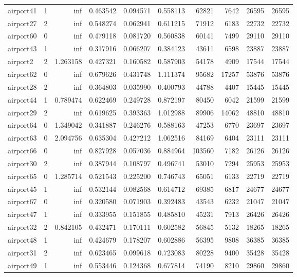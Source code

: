\begin{longtable}{|l|r|r|r|r|r|r|r|r|r|}
airport41 & 1 & inf & 0.463542 & 0.094571 & 0.558113 & 62821 & 7642 & 26595 & 26595 \\
airport27 & 2 & inf & 0.548274 & 0.062941 & 0.611215 & 71912 & 6183 & 22732 & 22732 \\
airport60 & 0 & inf & 0.479118 & 0.081720 & 0.560838 & 60141 & 7499 & 29110 & 29110 \\
airport43 & 1 & inf & 0.317916 & 0.066207 & 0.384123 & 43611 & 6598 & 23887 & 23887 \\
airport2 & 2 & 1.263158 & 0.427321 & 0.160582 & 0.587903 & 54178 & 4909 & 17544 & 17544 \\
airport62 & 0 & inf & 0.679626 & 0.431748 & 1.111374 & 95682 & 17257 & 53876 & 53876 \\
airport28 & 2 & inf & 0.364803 & 0.035990 & 0.400793 & 44788 & 4407 & 15445 & 15445 \\
airport44 & 1 & 0.789474 & 0.622469 & 0.249728 & 0.872197 & 80450 & 6042 & 21599 & 21599 \\
airport29 & 2 & inf & 0.619625 & 0.393363 & 1.012988 & 89906 & 14062 & 48810 & 48810 \\
airport64 & 0 & 1.349042 & 0.341887 & 0.246276 & 0.588163 & 47253 & 6770 & 23697 & 23697 \\
airport63 & 0 & 2.094756 & 0.635304 & 0.427212 & 1.062516 & 84169 & 6404 & 23111 & 23111 \\
airport66 & 0 & inf & 0.827928 & 0.057036 & 0.884964 & 103560 & 7182 & 26126 & 26126 \\
airport30 & 2 & inf & 0.387944 & 0.108797 & 0.496741 & 53010 & 7294 & 25953 & 25953 \\
airport65 & 0 & 1.285714 & 0.521543 & 0.225200 & 0.746743 & 65051 & 6133 & 22719 & 22719 \\
airport45 & 1 & inf & 0.532144 & 0.082568 & 0.614712 & 69385 & 6817 & 24677 & 24677 \\
airport67 & 0 & inf & 0.320580 & 0.071903 & 0.392483 & 43543 & 6232 & 21047 & 21047 \\
airport47 & 1 & inf & 0.333955 & 0.151855 & 0.485810 & 45231 & 7913 & 26426 & 26426 \\
airport32 & 2 & 0.842105 & 0.432471 & 0.170111 & 0.602582 & 56845 & 5132 & 18265 & 18265 \\
airport48 & 1 & inf & 0.424679 & 0.178207 & 0.602886 & 56395 & 9808 & 36385 & 36385 \\
airport31 & 2 & inf & 0.623465 & 0.099618 & 0.723083 & 80228 & 9400 & 35428 & 35428 \\
airport49 & 1 & inf & 0.553446 & 0.124368 & 0.677814 & 74190 & 8210 & 29860 & 29860 \\

\end{longtable}
